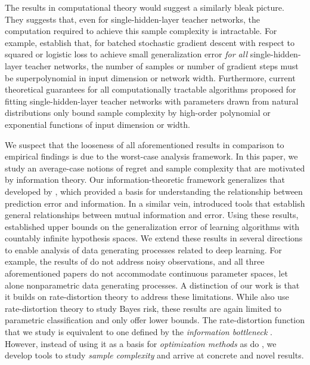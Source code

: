 \documentclass[twoside,11pt]{article}
\begin{document}
The results in computational theory would suggest a similarly bleak picture. They suggests that, even for single-hidden-layer teacher networks, the computation required to achieve this sample complexity is intractable.
For example, \citet{2020-Goel-superpolynomial-lower-bounds, 2020-Diakonikolas-algorithms-and-sq-lower-bounds} establish that, for batched stochastic gradient descent with respect to squared or logistic loss to achieve small generalization error \emph{for all} single-hidden-layer teacher networks, the number of samples or number of gradient steps must be superpolynomial in input dimension or network width.
Furthermore, current theoretical guarantees for all computationally tractable algorithms proposed for fitting single-hidden-layer teacher networks with parameters drawn from natural distributions only bound sample complexity by high-order polynomial \citep{2015-Janzamin-generalization-bounds-for-neural-networks-through-tensor-factorization,2017-Ge-learning-one-hidden-layer-neural-networks-with-landscape-design}
or exponential \citep{2017-Zhong-recovery-guarantees, 2020-Fu-guaranteed-recovery-of-one-hidden-layer-neural-networks-via-cross-entropy}
functions of input dimension or width.


We suspect that the looseness of all aforementioned results in comparison to empirical findings is due to the worst-case analysis framework. In this paper, we study an average-case notions of regret and sample complexity that are motivated by information theory. Our information-theoretic framework generalizes that developed by \cite{haussler1994bounds}, which provided a basis for understanding the relationship between prediction error and information. In a similar vein, \cite{russo2019much} introduced tools that establish general relationships between mutual information and error. Using these results, \cite{xu2017information} established upper bounds on the generalization error of learning algorithms with countably infinite hypothesis spaces. We extend these results in several directions to enable analysis of data generating processes related to deep learning. For example, the results of \cite{haussler1994bounds} do not address noisy observations, and all three aforementioned papers do not accommodate continuous parameter spaces, let alone nonparametric data generating processes. A distinction of our work is that it builds on rate-distortion theory to address these limitations. While \cite{7541669} also use rate-distortion theory to study Bayes risk, these results are again limited to parametric classification and only offer lower bounds. The rate-distortion function that we study is equivalent to one defined by the \emph{information bottleneck} \citep{tishby2000information}. However, instead of using it as a basis for \emph{optimization methods} as do \cite{shwartz2017opening}, we develop tools to study \emph{sample complexity} and arrive at concrete and novel results.
\end{document}
